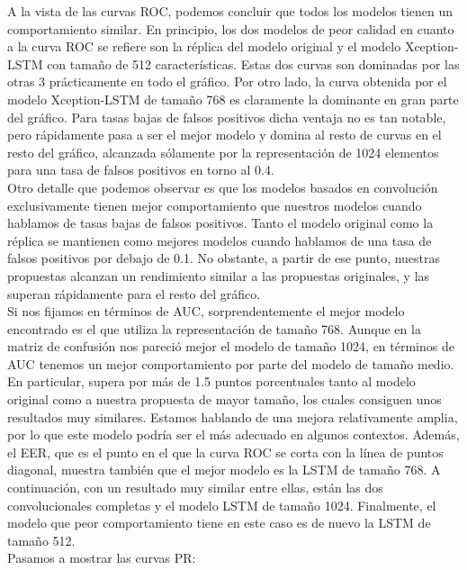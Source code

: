 \documentclass[../main.tex]{memoir}
\begin{document}
A la vista de las curvas ROC, podemos concluir que todos los modelos
tienen un comportamiento similar. En principio, los dos modelos de
peor calidad en cuanto a la curva ROC se refiere son la réplica del
modelo original y el modelo Xception-LSTM con tamaño de 512
características.  Estas dos curvas son dominadas por las otras 3
prácticamente en todo el gráfico. Por otro lado, la curva obtenida por
el modelo Xception-LSTM de tamaño 768 es claramente la dominante en
gran parte del gráfico. Para tasas bajas de falsos positivos dicha
ventaja no es tan notable, pero rápidamente pasa a ser el mejor modelo
y domina al resto de curvas en el resto del gráfico, alcanzada
sólamente por la representación de 1024 elementos para una tasa de
falsos positivos en torno al 0.4.\\

Otro detalle que podemos observar es que los modelos basados en
convolución exclusivamente tienen mejor comportamiento que nuestros
modelos cuando hablamos de tasas bajas de falsos positivos. Tanto el
modelo original como la réplica se mantienen como mejores modelos
cuando hablamos de una tasa de falsos positivos por debajo de 0.1. No
obstante, a partir de ese punto, nuestras propuestas alcanzan un
rendimiento similar a las propuestas originales, y las superan
rápidamente para el resto del gráfico.\\

Si nos fijamos en términos de AUC, sorprendentemente el mejor modelo
encontrado es el que utiliza la representación de tamaño 768. Aunque
en la matriz de confusión nos pareció mejor el modelo de tamaño 1024,
en términos de AUC tenemos un mejor comportamiento por parte del
modelo de tamaño medio. En particular, supera por más de 1.5 puntos
porcentuales tanto al modelo original como a nuestra propuesta de
mayor tamaño, los cuales consiguen unos resultados muy
similares. Estamos hablando de una mejora relativamente amplia, por lo
que este modelo podría ser el más adecuado en algunos
contextos. Además, el EER, que es el punto en el que la curva ROC se
corta con la línea de puntos diagonal, muestra también que el mejor
modelo es la LSTM de tamaño 768. A continuación, con un resultado muy
similar entre ellas, están las dos convolucionales completas y el
modelo LSTM de tamaño 1024. Finalmente, el modelo que peor
comportamiento tiene en este caso es de nuevo la LSTM
de tamaño 512.\\

Pasamos a mostrar las curvas PR:
\end{document}
